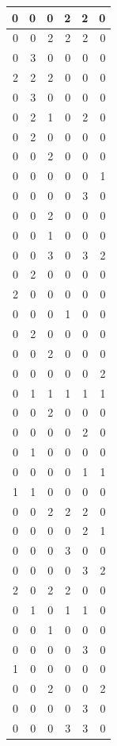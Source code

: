 \documentclass[
]{article}
\begin{document}
\begin{tabular}{r|r|r|r|r|r}
\hline
0 & 0 & 0 & 2 & 2 & 0\\
\hline
0 & 0 & 2 & 2 & 2 & 0\\
\hline
0 & 3 & 0 & 0 & 0 & 0\\
\hline
2 & 2 & 2 & 0 & 0 & 0\\
\hline
0 & 3 & 0 & 0 & 0 & 0\\
\hline
0 & 2 & 1 & 0 & 2 & 0\\
\hline
0 & 2 & 0 & 0 & 0 & 0\\
\hline
0 & 0 & 2 & 0 & 0 & 0\\
\hline
0 & 0 & 0 & 0 & 0 & 1\\
\hline
0 & 0 & 0 & 0 & 3 & 0\\
\hline
0 & 0 & 2 & 0 & 0 & 0\\
\hline
0 & 0 & 1 & 0 & 0 & 0\\
\hline
0 & 0 & 3 & 0 & 3 & 2\\
\hline
0 & 2 & 0 & 0 & 0 & 0\\
\hline
2 & 0 & 0 & 0 & 0 & 0\\
\hline
0 & 0 & 0 & 1 & 0 & 0\\
\hline
0 & 2 & 0 & 0 & 0 & 0\\
\hline
0 & 0 & 2 & 0 & 0 & 0\\
\hline
0 & 0 & 0 & 0 & 0 & 2\\
\hline
0 & 1 & 1 & 1 & 1 & 1\\
\hline
0 & 0 & 2 & 0 & 0 & 0\\
\hline
0 & 0 & 0 & 0 & 2 & 0\\
\hline
0 & 1 & 0 & 0 & 0 & 0\\
\hline
0 & 0 & 0 & 0 & 1 & 1\\
\hline
1 & 1 & 0 & 0 & 0 & 0\\
\hline
0 & 0 & 2 & 2 & 2 & 0\\
\hline
0 & 0 & 0 & 0 & 2 & 1\\
\hline
0 & 0 & 0 & 3 & 0 & 0\\
\hline
0 & 0 & 0 & 0 & 3 & 2\\
\hline
2 & 0 & 2 & 2 & 0 & 0\\
\hline
0 & 1 & 0 & 1 & 1 & 0\\
\hline
0 & 0 & 1 & 0 & 0 & 0\\
\hline
0 & 0 & 0 & 0 & 3 & 0\\
\hline
1 & 0 & 0 & 0 & 0 & 0\\
\hline
0 & 0 & 2 & 0 & 0 & 2\\
\hline
0 & 0 & 0 & 0 & 3 & 0\\
\hline
0 & 0 & 0 & 3 & 3 & 0\\

\end{tabular}
\end{document}
